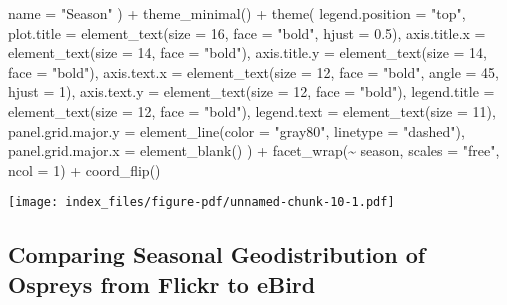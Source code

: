 \documentclass[
  letterpaper,
  DIV=11,
  numbers=noendperiod]{scrartcl}
\newenvironment{Shaded}{\begin{snugshade}}{\end{snugshade}}
\newcommand{\AttributeTok}[1]{\textcolor[rgb]{0.40,0.45,0.13}{#1}}
\newcommand{\DecValTok}[1]{\textcolor[rgb]{0.68,0.00,0.00}{#1}}
\newcommand{\FloatTok}[1]{\textcolor[rgb]{0.68,0.00,0.00}{#1}}
\newcommand{\FunctionTok}[1]{\textcolor[rgb]{0.28,0.35,0.67}{#1}}
\newcommand{\NormalTok}[1]{\textcolor[rgb]{0.00,0.23,0.31}{#1}}
\newcommand{\SpecialCharTok}[1]{\textcolor[rgb]{0.37,0.37,0.37}{#1}}
\newcommand{\StringTok}[1]{\textcolor[rgb]{0.13,0.47,0.30}{#1}}
\begin{document}
\begin{Shaded}
\begin{Highlighting}[]
    \AttributeTok{name =} \StringTok{"Season"}
\NormalTok{  ) }\SpecialCharTok{+}
  \FunctionTok{theme\_minimal}\NormalTok{() }\SpecialCharTok{+}
  \FunctionTok{theme}\NormalTok{(}
    \AttributeTok{legend.position =} \StringTok{"top"}\NormalTok{,}
    \AttributeTok{plot.title =} \FunctionTok{element\_text}\NormalTok{(}\AttributeTok{size =} \DecValTok{16}\NormalTok{, }\AttributeTok{face =} \StringTok{"bold"}\NormalTok{, }\AttributeTok{hjust =} \FloatTok{0.5}\NormalTok{), }
    \AttributeTok{axis.title.x =} \FunctionTok{element\_text}\NormalTok{(}\AttributeTok{size =} \DecValTok{14}\NormalTok{, }\AttributeTok{face =} \StringTok{"bold"}\NormalTok{),}
    \AttributeTok{axis.title.y =} \FunctionTok{element\_text}\NormalTok{(}\AttributeTok{size =} \DecValTok{14}\NormalTok{, }\AttributeTok{face =} \StringTok{"bold"}\NormalTok{),}
    \AttributeTok{axis.text.x =} \FunctionTok{element\_text}\NormalTok{(}\AttributeTok{size =} \DecValTok{12}\NormalTok{, }\AttributeTok{face =} \StringTok{"bold"}\NormalTok{, }\AttributeTok{angle =} \DecValTok{45}\NormalTok{, }\AttributeTok{hjust =} \DecValTok{1}\NormalTok{), }
    \AttributeTok{axis.text.y =} \FunctionTok{element\_text}\NormalTok{(}\AttributeTok{size =} \DecValTok{12}\NormalTok{, }\AttributeTok{face =} \StringTok{"bold"}\NormalTok{),}
    \AttributeTok{legend.title =} \FunctionTok{element\_text}\NormalTok{(}\AttributeTok{size =} \DecValTok{12}\NormalTok{, }\AttributeTok{face =} \StringTok{"bold"}\NormalTok{),}
    \AttributeTok{legend.text =} \FunctionTok{element\_text}\NormalTok{(}\AttributeTok{size =} \DecValTok{11}\NormalTok{),}
    \AttributeTok{panel.grid.major.y =} \FunctionTok{element\_line}\NormalTok{(}\AttributeTok{color =} \StringTok{"gray80"}\NormalTok{, }\AttributeTok{linetype =} \StringTok{"dashed"}\NormalTok{), }
    \AttributeTok{panel.grid.major.x =} \FunctionTok{element\_blank}\NormalTok{() }
\NormalTok{  ) }\SpecialCharTok{+}
  \FunctionTok{facet\_wrap}\NormalTok{(}\SpecialCharTok{\textasciitilde{}}\NormalTok{ season, }\AttributeTok{scales =} \StringTok{"free"}\NormalTok{, }\AttributeTok{ncol =} \DecValTok{1}\NormalTok{) }\SpecialCharTok{+}
  \FunctionTok{coord\_flip}\NormalTok{() }
\end{Highlighting}
\end{Shaded}

\texttt{[image: index\_files/figure-pdf/unnamed-chunk-10-1.pdf]}

\subsection{Comparing Seasonal Geodistribution of Ospreys from Flickr to
eBird}\label{comparing-seasonal-geodistribution-of-ospreys-from-flickr-to-ebird}
\end{document}
